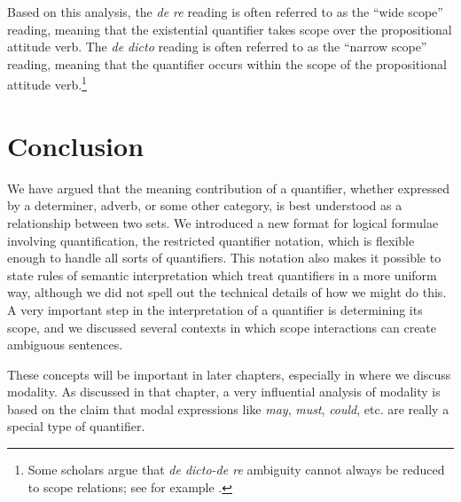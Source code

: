 Based on this analysis, the \textit{de re} reading is often referred to as the “wide scope” reading, meaning that the existential quantifier takes scope over the propositional attitude verb. The \textit{de dicto} reading is often referred to as the “narrow scope” reading, meaning that the quantifier occurs within the scope of the propositional attitude verb.\footnote{Some scholars argue that \textit{de dicto-de re} ambiguity cannot always be reduced to scope relations; see for example \citet{FodorSag1982}.}


\section{Conclusion}\label{sec:14.6}

We have argued that the meaning contribution of a quantifier, whether expressed by a determiner, adverb, or some other category, is best understood as a relationship between two sets. We introduced a new format for logical formulae involving quantification, the restricted quantifier notation, which is flexible enough to handle all sorts of quantifiers. This notation also makes it possible to state rules of semantic interpretation which treat quantifiers in a more uniform way, although we did not spell out the technical details of how we might do this. A very important step in the interpretation of a quantifier is determining its scope, and we discussed several contexts in which scope interactions can create ambiguous sentences.



These concepts will be important in later chapters, especially in  where we discuss modality. As discussed in that chapter, a very influential analysis of modality is based on the claim that modal expressions like \textit{may}, \textit{must}, \textit{could}, etc. are really a special type of quantifier.



